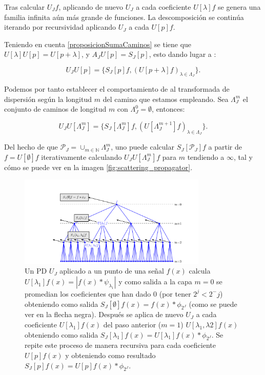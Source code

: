 \medskip

\noindent Tras calcular $U_Jf$, aplicando de nuevo $U_J$ a cada coeficiente $U[\lambda]f$ se genera una familia infinita aún más grande de funciones. La descomposición se continúa iterando  por recursividad aplicando $U_J$ a cada $U[p]f$. 

\medskip

\noindent Teniendo en cuenta \autoref{proposicionSumaCaminos} se tiene que  $U[\lambda]U[p]=U[p+\lambda]$, y $A_JU[p]=S_J[p]$, esto dando lugar a : 

\begin{equation}
  U_JU[p]=\lbrace S_J[p]f,(U[p+\lambda]f)_{\lambda\in\Lambda_J}\rbrace. 
\end{equation}



\medskip

\noindent Podemos por tanto establecer el comportamiento de al transformada de dispersión según la longitud $m$ del camino que estamos empleando. Sea $\Lambda_J^m$ el conjunto de caminos de longitud $m$ con $\Lambda_J^0={\emptyset}$, entonces:


\begin{equation} \label{eq::1.5}
  U_J U[\Lambda_J^m]=\lbrace S_J[\Lambda_J^m]f,(U[\Lambda_J^{m+1}]f)_{\lambda\in\Lambda_J}\rbrace.
\end{equation}

\noindent Del hecho de que $\mathcal{P}_J=\cup_{m\in \mathbb{N}}\Lambda_J^m$, uno puede calcular $S_J[\mathcal{P}_J]f$ a partir de $f=U[\emptyset]f$ iterativamente calculando $U_J U[\Lambda_J^m]f$ para $m$ tendiendo a $\infty$, tal y cómo se puede ver en la imagen \autoref{fig:scattering_propagator}. 

\begin{figure} [!h]
  \centering
  \includegraphics[width=0.8\textwidth]{img/ScatteringPropagator.png}
  \caption{Un PD $U_J$ aplicado a un punto de una señal $f(x)$ calcula $U[\lambda_1]f(x)=|f(x)\ast \psi_{\lambda_1}|$ y como salida a la capa $m=0$ se promedian los coeficientes que han dado $0$ (por tener $2^j<2^-j$) obteniendo como salida $S_J[\emptyset]f(x)=f(x)\ast \phi_{2^J}$ (como se puede ver en la flecha negra). Después se aplica de nuevo $U_J$ a cada coeficiente $U[\lambda_1]f(x)$ del paso anterior ($m=1$) $U[\lambda_1,\lambda2]f(x)$ obteniendo como salida $S_J[\lambda_1]f(x)=U[\lambda_1]f(x) \ast \phi_{2^J}$. Se repite este proceso de manera recursiva para cada coeficiente $U[p]f(x)$ y obteniendo como resultado $S_J[p]f(x)=U[p]f(x) \ast \phi_{2^J}$. }
  \label{fig:scattering_propagator}
\end{figure}


